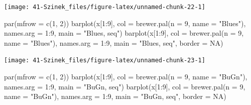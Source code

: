 \documentclass[
]{book}
\newenvironment{Shaded}{\begin{snugshade}}{\end{snugshade}}
\newcommand{\AttributeTok}[1]{\textcolor[rgb]{0.77,0.63,0.00}{#1}}
\newcommand{\ConstantTok}[1]{\textcolor[rgb]{0.00,0.00,0.00}{#1}}
\newcommand{\DecValTok}[1]{\textcolor[rgb]{0.00,0.00,0.81}{#1}}
\newcommand{\FunctionTok}[1]{\textcolor[rgb]{0.00,0.00,0.00}{#1}}
\newcommand{\NormalTok}[1]{#1}
\newcommand{\SpecialCharTok}[1]{\textcolor[rgb]{0.00,0.00,0.00}{#1}}
\newcommand{\StringTok}[1]{\textcolor[rgb]{0.31,0.60,0.02}{#1}}
\begin{document}
\begin{center}\texttt{[image: 41-Szinek\_files/figure-latex/unnamed-chunk-22-1]} \end{center}

\begin{Shaded}
\begin{Highlighting}[]
\FunctionTok{par}\NormalTok{(}\AttributeTok{mfrow =} \FunctionTok{c}\NormalTok{(}\DecValTok{1}\NormalTok{, }\DecValTok{2}\NormalTok{))}
\FunctionTok{barplot}\NormalTok{(x[}\DecValTok{1}\SpecialCharTok{:}\DecValTok{9}\NormalTok{], }\AttributeTok{col =} \FunctionTok{brewer.pal}\NormalTok{(}\AttributeTok{n =} \DecValTok{9}\NormalTok{, }\AttributeTok{name =} \StringTok{"Blues"}\NormalTok{), }\AttributeTok{names.arg =} \DecValTok{1}\SpecialCharTok{:}\DecValTok{9}\NormalTok{, }\AttributeTok{main =} \StringTok{"Blues, seq"}\NormalTok{)}
\FunctionTok{barplot}\NormalTok{(x[}\DecValTok{1}\SpecialCharTok{:}\DecValTok{9}\NormalTok{], }\AttributeTok{col =} \FunctionTok{brewer.pal}\NormalTok{(}\AttributeTok{n =} \DecValTok{9}\NormalTok{, }\AttributeTok{name =} \StringTok{"Blues"}\NormalTok{), }\AttributeTok{names.arg =} \DecValTok{1}\SpecialCharTok{:}\DecValTok{9}\NormalTok{, }\AttributeTok{main =} \StringTok{"Blues, seq"}\NormalTok{, }
    \AttributeTok{border =} \ConstantTok{NA}\NormalTok{)}
\end{Highlighting}
\end{Shaded}

\begin{center}\texttt{[image: 41-Szinek\_files/figure-latex/unnamed-chunk-23-1]} \end{center}

\begin{Shaded}
\begin{Highlighting}[]
\FunctionTok{par}\NormalTok{(}\AttributeTok{mfrow =} \FunctionTok{c}\NormalTok{(}\DecValTok{1}\NormalTok{, }\DecValTok{2}\NormalTok{))}
\FunctionTok{barplot}\NormalTok{(x[}\DecValTok{1}\SpecialCharTok{:}\DecValTok{9}\NormalTok{], }\AttributeTok{col =} \FunctionTok{brewer.pal}\NormalTok{(}\AttributeTok{n =} \DecValTok{9}\NormalTok{, }\AttributeTok{name =} \StringTok{"BuGn"}\NormalTok{), }\AttributeTok{names.arg =} \DecValTok{1}\SpecialCharTok{:}\DecValTok{9}\NormalTok{, }\AttributeTok{main =} \StringTok{"BuGn, seq"}\NormalTok{)}
\FunctionTok{barplot}\NormalTok{(x[}\DecValTok{1}\SpecialCharTok{:}\DecValTok{9}\NormalTok{], }\AttributeTok{col =} \FunctionTok{brewer.pal}\NormalTok{(}\AttributeTok{n =} \DecValTok{9}\NormalTok{, }\AttributeTok{name =} \StringTok{"BuGn"}\NormalTok{), }\AttributeTok{names.arg =} \DecValTok{1}\SpecialCharTok{:}\DecValTok{9}\NormalTok{, }\AttributeTok{main =} \StringTok{"BuGn, seq"}\NormalTok{, }
    \AttributeTok{border =} \ConstantTok{NA}\NormalTok{)}
\end{Highlighting}
\end{Shaded}
\end{document}
